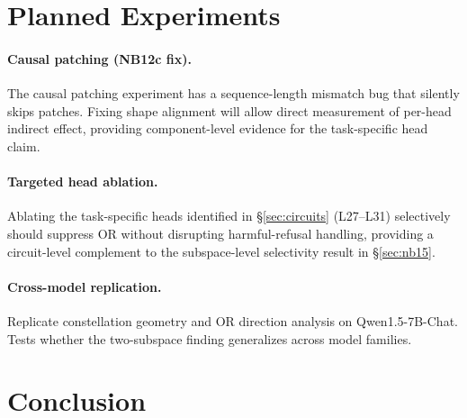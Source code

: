 \documentclass[11pt]{article}
\begin{document}
\section{Planned Experiments}
\label{sec:planned}

\paragraph{Causal patching (NB12c fix).}
The causal patching experiment has a sequence-length mismatch bug that silently skips
patches. Fixing shape alignment will allow direct measurement of per-head indirect
effect, providing component-level evidence for the task-specific head claim.

\paragraph{Targeted head ablation.}
Ablating the task-specific heads identified in \S\ref{sec:circuits} (L27--L31) selectively
should suppress OR without disrupting harmful-refusal handling, providing a circuit-level
complement to the subspace-level selectivity result in \S\ref{sec:nb15}.

\paragraph{Cross-model replication.}
Replicate constellation geometry and OR direction analysis on Qwen1.5-7B-Chat.
Tests whether the two-subspace finding generalizes across model families.

\section{Conclusion}
\end{document}
